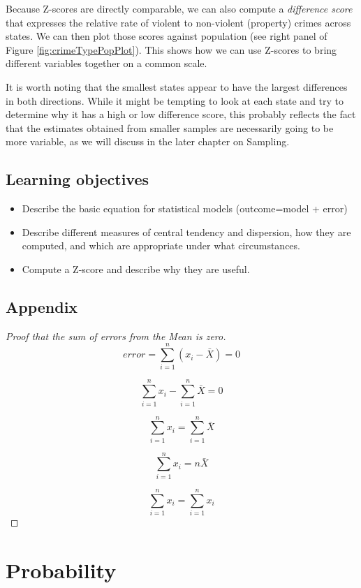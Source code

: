 \documentclass[12pt,]{book}
\providecommand{\tightlist}{%
  \setlength{\itemsep}{0pt}\setlength{\parskip}{0pt}}
\theoremstyle{definition}
\theoremstyle{definition}
\theoremstyle{definition}
\theoremstyle{remark}
\let\BeginKnitrBlock\begin \let\EndKnitrBlock\end
\begin{document}
Because Z-scores are directly comparable, we can also compute a \emph{difference score} that expresses the relative rate of violent to non-violent (property) crimes across states. We can then plot those scores against population (see right panel of Figure \ref{fig:crimeTypePopPlot}). This shows how we can use Z-scores to bring different variables together on a common scale.

It is worth noting that the smallest states appear to have the largest differences in both directions. While it might be tempting to look at each state and try to determine why it has a high or low difference score, this probably reflects the fact that the estimates obtained from smaller samples are necessarily going to be more variable, as we will discuss in the later chapter on Sampling.

\hypertarget{learning-objectives-4}{%
\section{Learning objectives}\label{learning-objectives-4}}

\begin{itemize}
\tightlist
\item
  Describe the basic equation for statistical models (outcome=model + error)
\item
  Describe different measures of central tendency and dispersion, how they are computed, and which are appropriate under what circumstances.
\item
  Compute a Z-score and describe why they are useful.
\end{itemize}

\hypertarget{appendix-1}{%
\section{Appendix}\label{appendix-1}}

\BeginKnitrBlock{proof}[Proof that the sum of errors from the Mean is zero]
{}
\[
error = \sum_{i=1}^{n}(x_i - \bar{X}) = 0
\]

\[
\sum_{i=1}^{n}x_i - \sum_{i=1}^{n}\bar{X}=0
\]

\[
\sum_{i=1}^{n}x_i = \sum_{i=1}^{n}\bar{X}
\]

\[
\sum_{i=1}^{n}x_i = n\bar{X}
\]

\[
\sum_{i=1}^{n}x_i = \sum_{i=1}^{n}x_i
\]
\EndKnitrBlock{proof}

\hypertarget{probability}{%
\chapter{Probability}\label{probability}}
\end{document}
